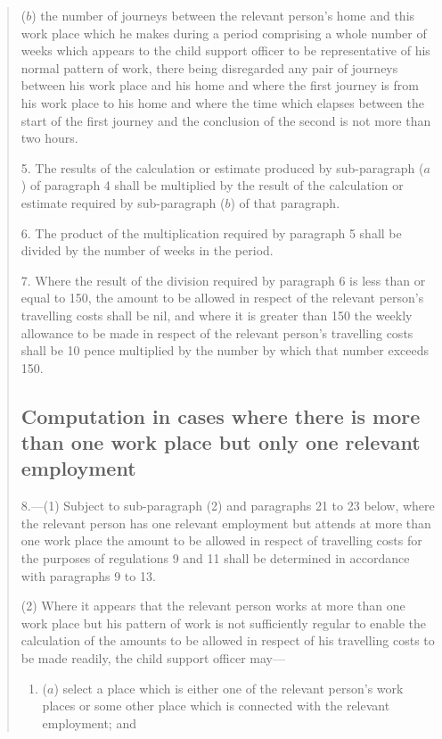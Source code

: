 \documentclass[12pt,a4paper]{article}
\begin{document}
\begin{quotation}
\begin{enumerate}
($b$) the number of journeys between the relevant person’s home and this work place which he makes during a period comprising a whole number of weeks which appears to the child support officer to be representative of his normal pattern of work, there being disregarded any pair of journeys between his work place and his home and where the first journey is from his work place to his home and where the time which elapses between the start of the first journey and the conclusion of the second is not more than two hours.
\end{enumerate}

\medskip

5.  The results of the calculation or estimate produced by sub-paragraph ($a$) of paragraph 4 shall be multiplied by the result of the calculation or estimate required by sub-paragraph ($b$) of that paragraph.

\medskip


6.  The product of the multiplication required by paragraph 5 shall be divided by the number of weeks in the period.

\medskip

7.  Where the result of the division required by paragraph 6 is less than or equal to 150, the amount to be allowed in respect of the relevant person’s travelling costs shall be nil, and where it is greater than 150 the weekly allowance to be made in respect of the relevant person’s travelling costs shall be 10 pence multiplied by the number by which that number exceeds 150.

\subsection*{Computation in cases where there is more than one work place but only one relevant employment}

8.—(1) Subject to sub-paragraph (2) and paragraphs 21 to 23 below, where the relevant person has one relevant employment but attends at more than one work place the amount to be allowed in respect of travelling costs for the purposes of regulations 9 and 11 shall be determined in accordance with paragraphs 9 to 13.

(2) Where it appears that the relevant person works at more than one work place but his pattern of work is not sufficiently regular to enable the calculation of the amounts to be allowed in respect of his travelling costs to be made readily, the child support officer may—
\begin{enumerate}\item[]
($a$) select a place which is either one of the relevant person’s work places or some other place which is connected with the relevant employment; and


\end{enumerate}
\end{quotation}
\end{document}
